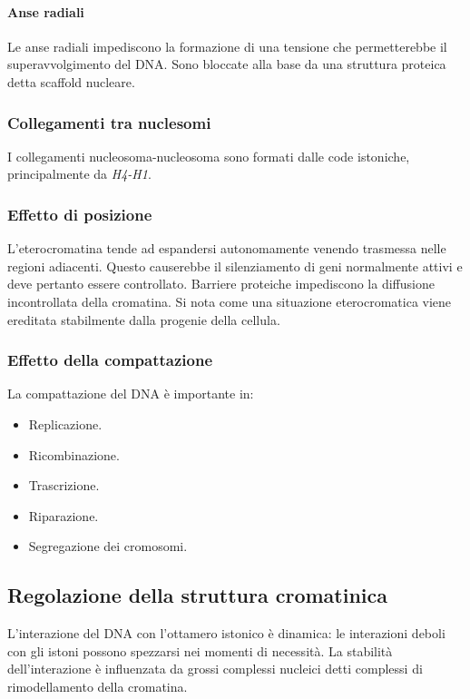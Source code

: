 			\paragraph{Anse radiali}
			Le anse radiali impediscono la formazione di una tensione che permetterebbe il superavvolgimento del DNA.
			Sono bloccate alla base da una struttura proteica detta scaffold nucleare.

		\subsubsection{Collegamenti tra nuclesomi}
		I collegamenti nucleosoma-nucleosoma sono formati dalle code istoniche, principalmente da \emph{H4-H1}.

		\subsubsection{Effetto di posizione}
		L'eterocromatina tende ad espandersi autonomamente venendo trasmessa nelle regioni adiacenti.
		Questo causerebbe il silenziamento di geni normalmente attivi e deve pertanto essere controllato.
		Barriere proteiche impediscono la diffusione incontrollata della cromatina.
		Si nota come una situazione eterocromatica viene ereditata stabilmente dalla progenie della cellula.

		\subsubsection{Effetto della compattazione}
		La compattazione del DNA \`e importante in:
		\begin{multicols}{3}
			\begin{itemize}
				\item Replicazione.
				\item Ricombinazione.
				\item Trascrizione.
				\item Riparazione.
				\item Segregazione dei cromosomi.
			\end{itemize}
		\end{multicols}

	\subsection{Regolazione della struttura cromatinica}
	L'interazione del DNA con l'ottamero istonico \`e dinamica: le interazioni deboli con gli istoni possono spezzarsi nei momenti di necessit\`a.
	La stabilit\`a dell'interazione \`e influenzata da grossi complessi nucleici detti complessi di rimodellamento  della cromatina.

